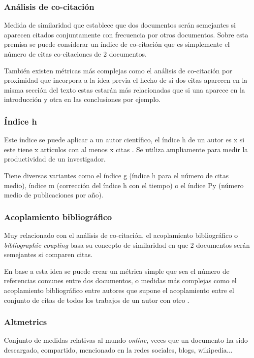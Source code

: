 \subsubsection{Análisis de co-citación}

Medida de similaridad que establece que dos documentos serán semejantes si aparecen citados conjuntamente con frecuencia por otros documentos. Sobre esta premisa se puede considerar un índice de co-citación que es simplemente el número de citas co-citaciones de 2 documentos. 

También existen métricas más complejas como el análisis de co-citación por proximidad que incorpora a la idea previa el hecho de si dos citas aparecen en la misma sección del texto estas estarán más relacionadas que si una aparece en la introducción y otra en las conclusiones por ejemplo. \cite{Gipp09a}

\subsubsection{Índice h}
Este índice se puede aplicar a un autor científico, el índice h de un autor es x si este tiene x artículos con al menos x citas \cite{BibliometricWhitePaper}. Se utiliza ampliamente para medir la productividad de un investigador.

Tiene diversas variantes como el índice g (índice h para el número de citas medio), índice m (corrección del índice h con el tiempo) o el índice Py (número medio de publicaciones por año).

\subsubsection{Acoplamiento bibliográfico}

Muy relacionado con el análisis de co-citación, el acoplamiento bibliográfico o \textit{bibliographic coupling} basa su concepto de similaridad en que 2 documentos serán semejantes si comparen citas.

En base a esta idea se puede crear un métrica simple que sea el número de referencias comunes entre dos documentos, o medidas más complejas como el acoplamiento bibliográfico entre autores que supone el acoplamiento entre el conjunto de citas de todos los trabajos de un autor con otro \cite{authorBiblioCoupling}.


\subsubsection{Altmetrics}  \label{altmetrics}
Conjunto de medidas relativas al mundo \textit{online}, veces que un documento ha sido descargado, compartido, mencionado en la redes sociales, blogs, wikipedia... \cite{almetrics}

